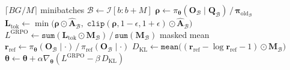 \documentclass[11pt]{article}
\begin{document}
\begin{algorithm}[p]
\begin{minipage}[t]{0.68\linewidth}
\begin{algorithmic}[1]
         \hfill $\lceil BG/M \rceil$ minibatches
            \State $\mathcal{B} \gets \mathcal{I}[b : b{+}M]$
            \State $\boldsymbol{\rho} \gets \pi_{\boldsymbol{\theta}}(\mathbf{O}_\mathcal{B} \mid \mathbf{Q}_\mathcal{B}) \,/\, \boldsymbol{\pi}_{\text{old}_\mathcal{B}}$
            \State $\mathbf{L}_{\text{tok}} \gets \min\!\big(\boldsymbol{\rho} \odot \hat{\mathbf{A}}_\mathcal{B},\; \texttt{clip}(\boldsymbol{\rho}, 1{-}\epsilon, 1{+}\epsilon) \odot \hat{\mathbf{A}}_\mathcal{B}\big)$
            \State $L^{\text{GRPO}} \gets \texttt{sum}(\mathbf{L}_{\text{tok}} \odot \mathbf{M}_\mathcal{B}) \,/\, \texttt{sum}(\mathbf{M}_\mathcal{B})$ \hfill masked mean
            \State $\mathbf{r}_{\text{ref}} \gets \pi_{\boldsymbol{\theta}}(\mathbf{O}_\mathcal{B} \mid \cdot) \,/\, \pi_{\text{ref}}(\mathbf{O}_\mathcal{B} \mid \cdot)$
            \State $D_{\text{KL}} \gets \texttt{mean}\!\big((\mathbf{r}_{\text{ref}} - \log \mathbf{r}_{\text{ref}} - 1) \odot \mathbf{M}_\mathcal{B}\big)$
            \State $\boldsymbol{\theta} \gets \boldsymbol{\theta} + \alpha \nabla_{\boldsymbol{\theta}} (L^{\text{GRPO}} - \beta\, D_{\text{KL}})$
        \EndFor
    \EndFor
\EndFor
\end{algorithmic}
\end{minipage}
\end{algorithm}
\end{document}

